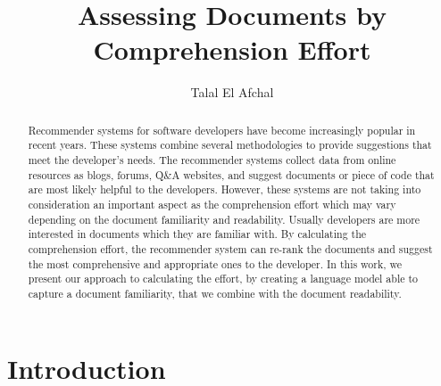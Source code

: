 \documentclass[mscthesis,20pt]{usiinfthesis}
\title{Assessing Documents by Comprehension Effort } %
\author{Talal El Afchal} %
\begin{document}
\maketitle %

\frontmatter %

\begin{abstract}
Recommender systems for software developers have become increasingly popular in recent years. These systems combine several methodologies to provide suggestions that meet the developer's needs. The recommender systems collect data from online resources as blogs, forums, Q\&A websites, and suggest documents or piece of code that are most likely helpful to the developers. However, these systems are not taking into consideration an important aspect as the comprehension effort which may vary depending on the document familiarity and readability. Usually developers are more interested in documents which they are familiar with. By calculating the comprehension effort, the recommender system can re-rank the documents and suggest the most comprehensive and appropriate ones to the developer. In this work, we present our approach to calculating the effort, by creating a language model able to capture a document familiarity, that we combine with the document readability. 
\end{abstract}

\begin{acknowledgements}
\end{acknowledgements}

\tableofcontents 
\listoffigures %
\listoftables %

\mainmatter

\chapter{Introduction}
\end{document}
